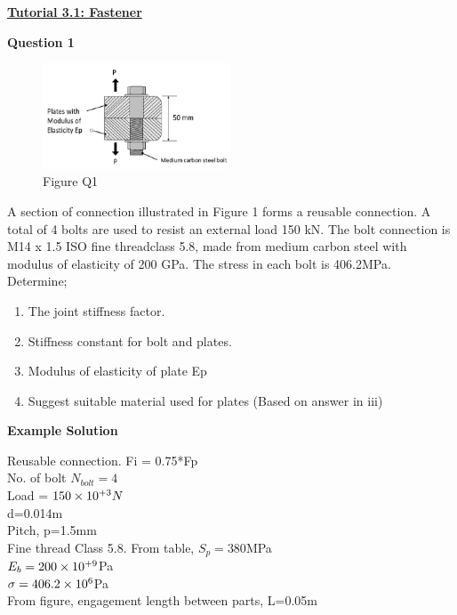 \documentclass[a4paper, fleqn]{article}
\providecommand{\sci}[1]{\protect\ensuremath{\times 10^{\StrSubstitute[0]{#1}{e}{}}}}
\begin{document}
\underline{\textbf{Tutorial 3.1: Fastener}}
\vspace{10pt}

\textbf{Question 1}

\begin{figure}[h]
    \centering
    \includegraphics[width=0.5\textwidth]{t31-q1.png}
    \caption{Figure Q1}
\end{figure}

A section of connection illustrated in Figure 1 forms a reusable connection. A total of 4 bolts are used to resist an external load 150 kN. The bolt connection is M14 x 1.5 ISO fine threadclass 5.8, made from medium carbon steel with modulus of elasticity of 200 GPa. The stress in each bolt is 406.2MPa. Determine;

\begin{enumerate}[label=(\roman*)]
    \item The joint stiffness factor.
    \item Stiffness constant for bolt and plates.
    \item Modulus of elasticity of plate Ep
    \item Suggest suitable material used for plates (Based on answer in iii)
\end{enumerate}

\vspace{10pt}
\textbf{Example Solution}
\vspace{10pt}

Reusable connection. Fi = 0.75*Fp\\
No. of bolt $N_{bolt}=4$\\
Load = $150\sci{e+3}N$\\
d=0.014m\\
Pitch, p=1.5mm\\
Fine thread Class 5.8. From table, $S_p=380$MPa\\
$E_b=200\sci{e+9}$Pa\\
$\sigma = 406.2\sci{e6}$Pa\\
From figure, engagement length between parts, L=0.05m
\vspace{10pt}
\end{document}
